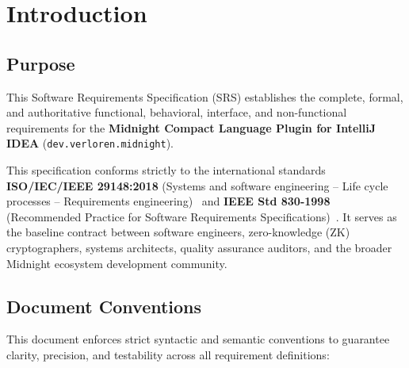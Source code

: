 \section{Introduction}
\label{sec:introduction}

\subsection{Purpose}
This Software Requirements Specification (SRS) establishes the complete, formal, and authoritative functional, behavioral, interface, and non-functional requirements for the \textbf{Midnight Compact Language Plugin for IntelliJ IDEA} (\texttt{dev.verloren.midnight}). 

This specification conforms strictly to the international standards \textbf{ISO/IEC/IEEE 29148:2018} (Systems and software engineering -- Life cycle processes -- Requirements engineering)~\cite{iso29148} and \textbf{IEEE Std 830-1998} (Recommended Practice for Software Requirements Specifications)~\cite{ieee830}. It serves as the baseline contract between software engineers, zero-knowledge (ZK) cryptographers, systems architects, quality assurance auditors, and the broader Midnight ecosystem development community.

\subsection{Document Conventions}
\label{sec:conventions}
This document enforces strict syntactic and semantic conventions to guarantee clarity, precision, and testability across all requirement definitions:

